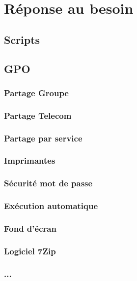 \section{Réponse au besoin}
	\subsection{Scripts}
	\subsection{GPO}
		\subsubsection{Partage Groupe}
		\subsubsection{Partage Telecom}
		\subsubsection{Partage par service}
		\subsubsection{Imprimantes}
		\subsubsection{Sécurité mot de passe}
		\subsubsection{Exécution automatique}
		\subsubsection{Fond d'écran}
		\subsubsection{Logiciel 7Zip}
		\subsubsection{...}